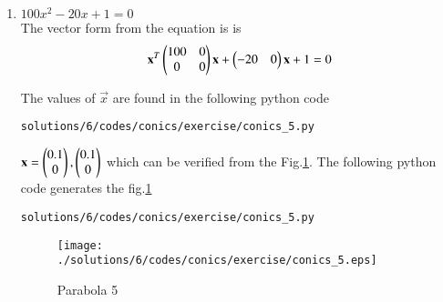 \begin{enumerate}
\item $100x^2-20x+1=0$ \\
The vector form from the equation is is
\begin{align}
\mathbf{x}^T\begin{pmatrix}100&0\\0&0\end{pmatrix}\mathbf{x}+\begin{pmatrix}-20&0\end{pmatrix}\mathbf{x}+1=0
\end{align}

The values of $\vec{x}$ are found in the following python code
\begin{lstlisting}
solutions/6/codes/conics/exercise/conics_5.py
\end{lstlisting}

$\mathbf{x}= \begin{pmatrix}0.1\\0\end{pmatrix}, \begin{pmatrix}0.1\\0\end{pmatrix}$
which can be verified from the Fig.\ref{fig:5.2.6_parabola_5}.
The following python code generates the fig.\ref{fig:5.2.6_parabola_5}
\begin{lstlisting}
solutions/6/codes/conics/exercise/conics_5.py
\end{lstlisting}
\begin{figure}[!ht]
\texttt{[image: ./solutions/6/codes/conics/exercise/conics\_5.eps]}
\caption{Parabola 5}
\label{fig:5.2.6_parabola_5}
\end{figure} 

\end{enumerate}

